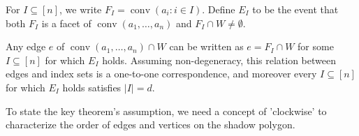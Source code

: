 \documentclass{theoretics}
\newcommand{\R}{\mathbb R}
\newcommand{\conv}{\operatorname{conv}}
\renewcommand{\subset}{\subseteq}
\begin{document}
\begin{definition}\label{def:edge-event}
    For $I \subset [n]$, we write $F_I = \conv(a_i : i \in I)$.
    Define $E_I$ to be the event that both
    $F_I$ is a facet of $\conv(a_1,\dots,a_n)$
    and $F_I \cap W \neq \emptyset$.
\end{definition}

\begin{remark}\label{fact:edgecounting}
    Any edge $e$ of $\conv(a_1,\dots,a_n) \cap W$ can be written as $e = F_I \cap W$
    for some $I \subset [n]$ for which $E_I$ holds.
    Assuming non-degeneracy, this relation between edges and index sets
    is a one-to-one correspondence, and moreover every $I \subset [n]$
    for which $E_I$ holds satisfies $|I|=d$.
\end{remark}

To state the key theorem's assumption, we need a concept of 'clockwise' to characterize the order of edges and vertices on the shadow polygon.
\end{document}
